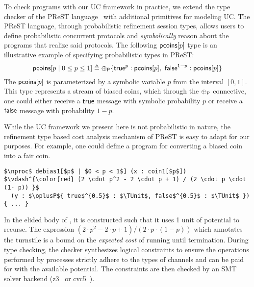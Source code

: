 To check programs with our UC framework in practice, we extend the type checker of the
PReST language~\cite{prest} with additional primitives for modeling UC. The PReST
language, through probabilistic refinement session types, allows users to define
probabilistic concurrent protocols and \emph{symbolically} reason about the programs that
realize said protocols. The following $\mathsf{pcoins}[p]$ type is an illustrative example of 
specifying probabilistic types in PReST:
\begin{align*}
  \mathsf{pcoins}[p \mid 0 \leq p \leq 1] \triangleq 
    {\oplus_{\textsf{P}}}\{ \mathsf{true}^{p} : \mathsf{pcoins}[p]
           ,\ \mathsf{false}^{1 - p} : \mathsf{pcoins}[p] \}
\end{align*}
The $\mathsf{pcoins}[p]$ is parameterized by a symbolic variable $p$ from the
interval $[0, 1]$. This type represents a stream of biased coins, which through
the ${\oplus_{\textsf{P}}}$ connective, one could either receive a $\mathsf{true}$ message
with symbolic probability $p$ or receive a $\mathsf{false}$ message with
probability $1 - p$.

While the UC framework we present here is not probabilistic in nature, the 
refinement type based cost analysis mechanism of PReST is easy to adapt for our
purposes.  For example, one could define a  program for converting
a biased coin into a fair coin.
\begin{lstlisting}[basicstyle=\footnotesize\BeraMonottFamily, frame=single,  mathescape]
$\nproc$ debias1[$p$ | $0 < p < 1$] (x : coin1[$p$])
$\vdash^{\color{red} (2 \cdot p^2 - 2 \cdot p + 1) / (2 \cdot p \cdot (1- p)) }$ 
  (y : $\oplusP${ true$^{0.5}$ : $\TUnit$, false$^{0.5}$ : $\TUnit$ }) { ... }
\end{lstlisting}

In the elided body of , it is constructed such that it uses 1 unit 
of potential to recurse. The expression $(2 \cdot p^2 - 2 \cdot p + 1) / (2 \cdot p \cdot (1- p))$
which annotates the turnstile is a bound on the \emph{expected cost} of running
 until termination. During type checking, the checker 
synthesizes logical constraints to ensure the operations
performed by processes strictly adhere to the types of
channels and can be paid for with the available potential.
The constraints are then checked by an SMT solver backend
(z3~\cite{Moura08Z3} or cvc5~\cite{Barbosa22CVC5}). 

